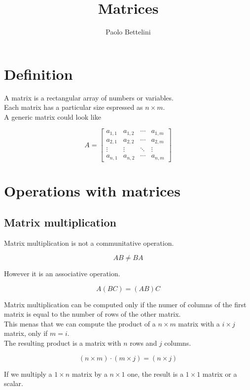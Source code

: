 \documentclass{article}
\title{Matrices}
\author{Paolo Bettelini}
\date{}
\begin{document}
\maketitle
\tableofcontents
\pagebreak

\section{Definition}

A matrix is a rectangular array of numbers or variables. \\
Each matrix has a particular size espressed as \(n \times m\). \\
A generic matrix could look like

\[
A = \begin{bmatrix} 
        a_{1,1} & a_{1,2} & \cdots & a_{1,m} \\
        a_{2,1} & a_{2,2} & \cdots & a_{2,m} \\
        \vdots  & \vdots  & \ddots & \vdots  \\
        a_{n,1} & a_{n,2} & \cdots & a_{n,m} 
    \end{bmatrix}
\]

\section{Operations with matrices}

\subsection{Matrix multiplication}

Matrix multiplication is not a communitative operation.

\[
    AB\neq BA
\]

However it is an associative operation.

\[
    A(BC)=(AB)C
\]

Matrix multiplication can be computed only if the numer of columns of the first matrix is equal to the number of rows of the other matrix. \\
This menas that we can compute the product of a \(n \times m\) matrix with a \(i \times j\) matrix, only if \(m=i\). \\
The resulting product is a matrix with \(n\) rows and \(j\) columns.

\[
    (n \times m) \cdot (m \times j) = (n \times j)
\]

If we multiply a \(1 \times n\) matrix by a \(n \times 1\) one, the result is a \(1 \times 1\) matrix or a scalar.
\end{document}
